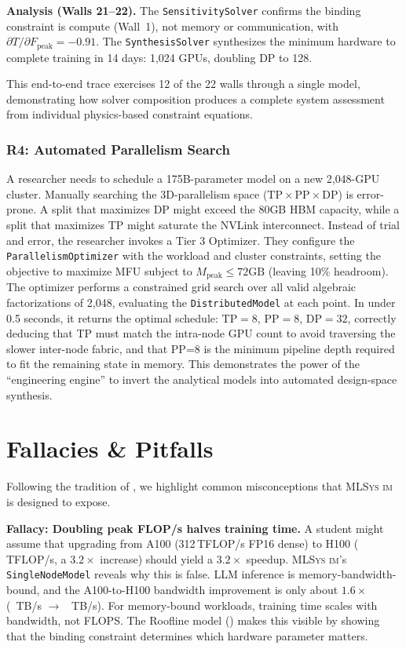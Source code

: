 \documentclass[10pt,twocolumn]{article}
\newcommand{\mlsysim}{\mbox{\textsc{MLSys}\,\textperiodcentered\,\textsc{im}}\xspace}
\newcommand{\cval}[1]{\pgfmathprintnumber[fixed, precision=1, 1000 sep={\,}]{#1}}
\newcommand{\cvalii}[1]{\pgfmathprintnumber[fixed, precision=2, 1000 sep={\,}]{#1}}
\newcommand{\cvalint}[1]{\pgfmathprintnumber[fixed, precision=0, 1000 sep={\,}]{#1}}
\begin{document}
\textbf{Analysis (Walls 21--22).} The \texttt{SensitivitySolver} confirms the binding constraint is compute (Wall~1), not memory or communication, with $\partial T / \partial F_{\text{peak}} = -0.91$. The \texttt{SynthesisSolver} synthesizes the minimum hardware to complete training in 14 days: 1{,}024 GPUs, doubling DP to 128.

This end-to-end trace exercises 12 of the 22 walls through a single model, demonstrating how solver composition produces a complete system assessment from individual physics-based constraint equations.

\subsubsection{R4: Automated Parallelism Search}
A researcher needs to schedule a 175B-parameter model on a new 2{,}048-GPU cluster. Manually searching the 3D-parallelism space ($\text{TP} \times \text{PP} \times \text{DP}$) is error-prone. A split that maximizes DP might exceed the 80GB HBM capacity, while a split that maximizes TP might saturate the NVLink interconnect. Instead of trial and error, the researcher invokes a Tier 3 Optimizer. They configure the \texttt{ParallelismOptimizer} with the workload and cluster constraints, setting the objective to maximize MFU subject to $M_{\text{peak}} \le 72\text{GB}$ (leaving 10\% headroom). The optimizer performs a constrained grid search over all valid algebraic factorizations of 2{,}048, evaluating the \texttt{DistributedModel} at each point. In under 0.5 seconds, it returns the optimal schedule: $\text{TP}{=}8$, $\text{PP}{=}8$, $\text{DP}{=}32$, correctly deducing that TP must match the intra-node GPU count to avoid traversing the slower inter-node fabric, and that PP=8 is the minimum pipeline depth required to fit the remaining state in memory. This demonstrates the power of the ``engineering engine'' to invert the analytical models into automated design-space synthesis.

\section{Fallacies \& Pitfalls}
\label{sec:fallacies}

Following the tradition of \citet{hennessy2024architecture}, we highlight common misconceptions that \mlsysim is designed to expose.

\textbf{Fallacy: Doubling peak FLOP/s halves training time.}
A student might assume that upgrading from A100 (312\,TFLOP/s FP16 dense) to H100 (\cvalint{\HhPeakTFLOPS}\,TFLOP/s, a $3.2{\times}$ increase) should yield a $3.2{\times}$ speedup. \mlsysim's \texttt{SingleNodeModel} reveals why this is false. LLM inference is memory-bandwidth-bound, and the A100-to-H100 bandwidth improvement is only about $1.6{\times}$ (\cval{\AhBWTBs}~TB/s $\to$ \cvalii{\HhBWTBs}~TB/s). For memory-bound workloads, training time scales with bandwidth, not FLOPS. The Roofline model () makes this visible by showing that the binding constraint determines which hardware parameter matters.
\end{document}
